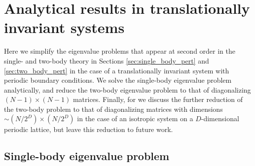 \documentclass[nofootinbib,notitlepage,11pt]{revtex4-2}
\newcommand{\p}[1]{\left(#1\right)} %
\newcommand{\1}{\mathds{1}}
\begin{document}
\section{Analytical results in translationally invariant systems}
\label{sec:trans_inv}

Here we simplify the eigenvalue problems that appear at second order
in the single- and two-body theory in Sections
\ref{sec:single_body_pert} and \ref{sec:two_body_pert} in the case of
a translationally invariant system with periodic boundary conditions.
We solve the single-body eigenvalue problem analytically, and reduce
the two-body eigenvalue problem to that of diagonalizing
$\p{N-1}\times\p{N-1}$ matrices.  Finally, for we discuss the further
reduction of the two-body problem to that of diagonalizing matrices
with dimensions $\sim\p{N/2^D}\times\p{N/2^D}$ in the case of an
isotropic system on a $D$-dimensional periodic lattice, but leave this
reduction to future work.

\subsection{Single-body eigenvalue problem}
\label{sec:trans_inv_single}
\end{document}
